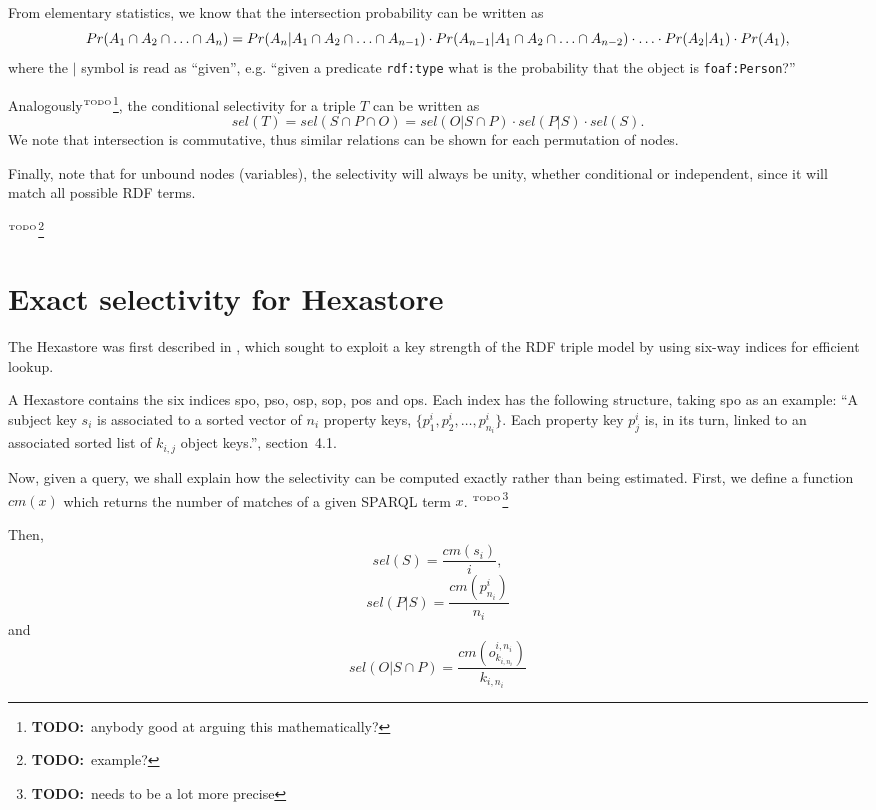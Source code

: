 \documentclass[12pt, draft]{article}
\newcommand{\rdfterm}[1]{\texttt{#1}}
\newcommand{\todo}[1]{\ensuremath{^{\textrm{\tiny{TODO}\normalsize}}}\footnote{\textbf{TODO:}~#1}}
\begin{document}
From elementary statistics, we know that the intersection probability
can be written as
\begin{equation}
Pr(A_1 \cap A_2  \cap \ldots \cap A_n) = 
  Pr(A_n | A_1 \cap A_2  \cap \ldots \cap A_{n-1}) \\
  \cdot Pr(A_{n-1} | A_1 \cap A_2  \cap \ldots \cap A_{n-2}) 
  \cdot \ldots \cdot Pr(A_2 | A_1) \cdot Pr(A_1) ,
\end{equation}
where the $|$ symbol is read as ``given'', e.g. ``given a predicate
\rdfterm{rdf:type} what is the probability that the object is \rdfterm{foaf:Person}?''

Analogously\todo{anybody good at arguing this mathematically?}, the conditional selectivity for a triple $T$ can be written as 
\begin{equation}
sel(T) = sel(S \cap P \cap O) = sel(O | S \cap P) \cdot sel(P | S)
\cdot sel(S) . 
\end{equation}
We note that intersection is commutative, thus similar
relations can be shown for each permutation of nodes.

Finally, note that for unbound nodes (variables), the selectivity will
always be unity, whether conditional or independent, since it will
match all possible RDF terms. 

\todo{example?}

\section{Exact selectivity for Hexastore}

The Hexastore was first described in
\cite{Weiss:2008:HSI:1453856.1453965}, which sought to exploit a key
strength of the RDF triple model by using six-way indices for
efficient lookup.

A Hexastore contains the six indices \textsf{spo}, \textsf{pso},
\textsf{osp}, \textsf{sop}, \textsf{pos} and \textsf{ops}. Each index
has the following structure, taking \textsf{spo} as an example: ``A
subject key $s_i$ is associated to a sorted vector of $n_i$ property
keys, $\{p_1^i , p_2^i , \ldots , p^i_{n_i} \}$. Each property key $p_j^i$
is, in its turn, linked to an associated sorted list of $k_{i,j}$
object keys.''\cite{Weiss:2008:HSI:1453856.1453965}, section~4.1.

Now, given a query, we shall explain how the selectivity can be
computed exactly rather than being estimated. First, we define a
function $cm(x)$ which returns the number of matches of a given SPARQL
term $x$. \todo{needs to be a lot more precise}

Then, 
\begin{equation}
sel(S) = \frac{cm(s_i)}{i} ,
\end{equation}
\begin{equation}
sel(P|S) = \frac{cm(p_{n_i}^i)}{n_i}
\end{equation}
and
\begin{equation}
sel(O|S \cap P) = \frac{cm(o_{k_{i,n_i}}^{i,n_i})}{k_{i,n_i}}
\end{equation}





\end{document}
